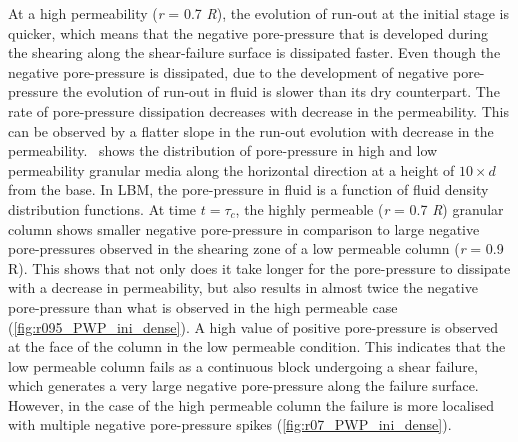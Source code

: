 \documentclass[12pt,a4paper,twocolumn,fleqn]{narms}
\begin{document}
At a high permeability (\textit{r} = 0.7 \textit{R}), the evolution of run-out 
at the initial stage is quicker, which means that the negative pore-pressure 
that is developed during the shearing along the shear-failure surface is 
dissipated faster. Even though the negative pore-pressure is dissipated, due to 
the development of negative pore-pressure the evolution of run-out in fluid is 
slower than its dry counterpart. The rate of pore-pressure dissipation 
decreases with decrease in the permeability. This can be observed by a flatter 
slope in the run-out evolution with decrease in the 
permeability.~ shows the distribution of pore-pressure 
in high and low permeability granular media along the horizontal direction at a 
height of $10 \times d$ from the base. In LBM, the pore-pressure in fluid is a 
function of fluid density distribution functions. At time $t = \tau_c$, the 
highly permeable (\textit{r} = 0.7 \textit{R}) granular column 
shows smaller negative pore-pressure in comparison to large negative 
pore-pressures observed in the shearing zone of a low permeable column 
(\textit{r} = 0.9 R). This shows that not only does it take longer for the 
pore-pressure to dissipate with a decrease in permeability, but also results in 
almost twice the negative pore-pressure than what is observed in the high 
permeable case (\cref{fig:r095_PWP_ini_dense}). A 
high value of positive pore-pressure is observed at the face of the column 
in the low permeable condition. This indicates that the low permeable column 
fails as a continuous block undergoing a shear failure, which generates a very 
large negative pore-pressure along the failure surface. However, in the case of 
the high permeable column the failure is more localised with multiple negative 
pore-pressure spikes (\cref{fig:r07_PWP_ini_dense}).
\end{document}
